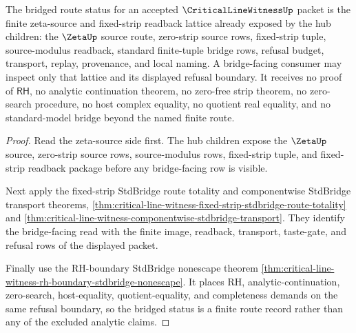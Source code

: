 \begin{theorem}
\label{thm:critical-line-witness-bridged-route-status}
The bridged route status for an accepted $\CriticalLineWitnessUp$ packet is the finite zeta-source and fixed-strip readback lattice already exposed by the hub children: the $\ZetaUp$ source route, zero-strip source rows, fixed-strip tuple, source-modulus readback, standard finite-tuple bridge rows, refusal budget, transport, replay, provenance, and local naming. A bridge-facing consumer may inspect only that lattice and its displayed refusal boundary. It receives no proof of $\mathsf{RH}$, no analytic continuation theorem, no zero-free strip theorem, no zero-search procedure, no host complex equality, no quotient real equality, and no standard-model bridge beyond the named finite route.
\end{theorem}
\begin{proof}
Read the zeta-source side first. The hub children expose the $\ZetaUp$ source, zero-strip source rows, source-modulus rows, fixed-strip tuple, and fixed-strip readback package before any bridge-facing row is visible.

Next apply the fixed-strip StdBridge route totality and componentwise StdBridge transport theorems, \autoref{thm:critical-line-witness-fixed-strip-stdbridge-route-totality} and \autoref{thm:critical-line-witness-componentwise-stdbridge-transport}. They identify the bridge-facing read with the finite image, readback, transport, taste-gate, and refusal rows of the displayed packet.

Finally use the RH-boundary StdBridge nonescape theorem \autoref{thm:critical-line-witness-rh-boundary-stdbridge-nonescape}. It places RH, analytic-continuation, zero-search, host-equality, quotient-equality, and completeness demands on the same refusal boundary, so the bridged status is a finite route record rather than any of the excluded analytic claims.
\end{proof}
